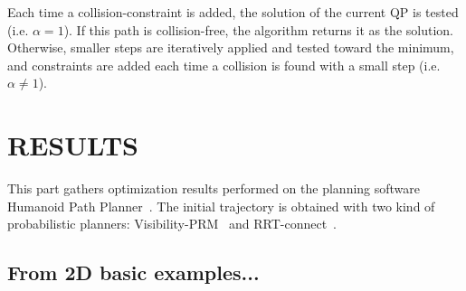 \documentclass{tADR2e}
\begin{document}
Each time a collision-constraint is added, 
the solution of the current QP is tested (i.e. $\alpha = 1$). If this path is collision-free, the algorithm returns it as the solution. Otherwise, 
smaller steps are iteratively applied and tested toward the minimum, and constraints are added each time a collision is found with a small step (i.e. $\alpha \neq 1$).


\section{RESULTS}

This part gathers optimization results performed on the planning software 
Humanoid Path Planner~\cite{hpp}. The initial trajectory is obtained with two 
kind of probabilistic planners: Visibility-PRM~\cite{visibility-prm} and 
RRT-connect~\cite{rrt-connect}.

\subsection{From 2D basic examples...}
\end{document}
